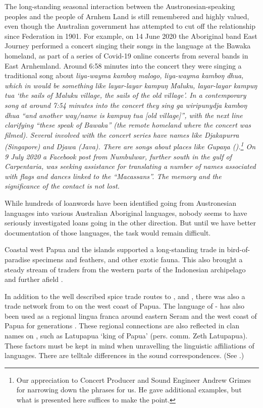The long-standing seasonal interaction between the Austronesian-speaking peoples
and the people of Arnhem Land is still remembered
and highly valued, even though the Australian government has attempted to cut off
the relationship since Federation in 1901.
For example, on 14 June 2020 the Aboriginal band East Journey performed a concert
singing their songs in the  language at the Bawaka homeland,
as part of a series of Covid-19 online concerts
from several bands in East Arnhemland.
Around 6:58 minutes into the concert they were singing a traditional song about
\it{liya-wayma kamboŋ malogo, liya-wayma kamboŋ dhua},
which in  would be something like
\it{layar-layar kampuŋ Maluku, layar-layar kampuŋ tua}
‘the sails of Maluku village, the sails of the old village’.
In a contemporary song at around 7:54 minutes into the concert they sing
\it{ga wiripunydja kamboŋ dhua} “and another way/name is \it{kampuŋ tua} [old village]”,
with the next line clarifying “these speak of Bawaka”
(the remote homeland where the concert was filmed).
Several involved with the concert series have names
like Djakapurra (Singapore) and Djawa (Java).
There are songs about places like \it{Gupaŋa} ().\footnote{
		Our appreciation
		to Concert Producer and Sound Engineer Andrew Grimes for narrowing down the phrases for us.
		He gave additional examples,
		but what is presented here suffices to make the point.}
On 9 July 2020 a Facebook
post from Numbulwar, further south in the gulf of Carpentaria,
was seeking assistance for translating a number of names associated with flags
and dances linked to the “Macassans”.
The memory and the significance of the contact is not lost.

While hundreds of loanwords have been identified going from Austronesian languages
into various Australian Aboriginal languages,
nobody seems to have seriously investigated loans going in the other direction.
But until we have better documentation of those languages,
the task would remain difficult.

Coastal west Papua and the  islands supported a
long-standing trade in bird-of-paradise
specimens and feathers, and other exotic fauna.
This also brought a steady stream of traders from the western parts of the Indonesian
archipelago and further afield \citep{Andaya2017}.

In addition to the well described spice trade routes to ,
 and , there was also a trade network from
 to  on the west coast of Papua.
The language of - has also been used as a regional lingua franca around
eastern Seram and the west coast of Papua for generations
\citep{LoskiLoski1989,WalkerWalker1991,Zobel2014}.
These regional connections are also reflected in clan names on ,
such as Latupapua ‘king of Papua’ (pers. comm. Zeth Latupapua).
These factors must be kept in mind when unravelling the linguistic
affiliations of  languages.
There are telltale differences in the sound correspondences.
(See .) 

